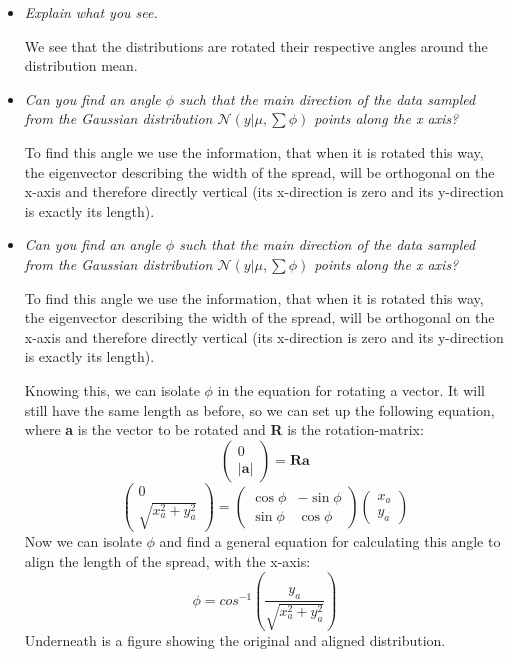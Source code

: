 \documentclass[12pt, a4paper]{article}
\begin{document}
\begin{itemize}
\item \textit{Explain what you see.}

We see that the distributions are rotated their respective angles around the distribution mean.

\item \textit{Can you find an angle $\phi$ such that the main direction of the data sampled from the Gaussian distribution $\mathcal{N}(y|\mu, \sum \phi )$ points along the x axis?}

To find this angle we use the information, that when it is rotated this way, the eigenvector describing the width of the spread, will be orthogonal on the x-axis and therefore directly vertical (its x-direction is zero and its y-direction is exactly its length).

\item \textit{Can you find an angle $\phi$ such that the main direction of the data sampled from the Gaussian distribution $\mathcal{N}(y|\mu, \sum \phi )$ points along the x axis?}

To find this angle we use the information, that when it is rotated this way, the eigenvector describing the width of the spread, will be orthogonal on the x-axis and therefore directly vertical (its x-direction is zero and its y-direction is exactly its length).

Knowing this, we can isolate $\phi$ in the equation for rotating a vector. It will still have the same length as before, so we can set up the following equation, where \textbf{a} is the vector to be rotated and \textbf{R} is the rotation-matrix:
\begin{equation*}
\left( \begin{array}{c}
0 \\
|\textbf{a}| \end{array} \right)
=
\textbf{R}\textbf{a}
\end{equation*}
\begin{equation*}
\left( \begin{array}{c}
0 \\
\sqrt{x_a^2+y_a^2} 
\end{array} \right)
=
\left( \begin{array}{cc}
\cos \phi & -\sin \phi \\
\sin \phi & \cos \phi \end{array} \right)
\left( \begin{array}{c}
x_a \\
y_a \end{array} \right)
\end{equation*} 
Now we can isolate $\phi$ and find a general equation for calculating this angle to align the length of the spread, with the x-axis:
\begin{equation*}
\phi = cos^{-1}\left(\dfrac{y_a}{\sqrt{x_a^2+y_a^2}}\right)
\end{equation*} 
Underneath is a figure showing the original and aligned distribution.


\end{itemize}
\end{document}
